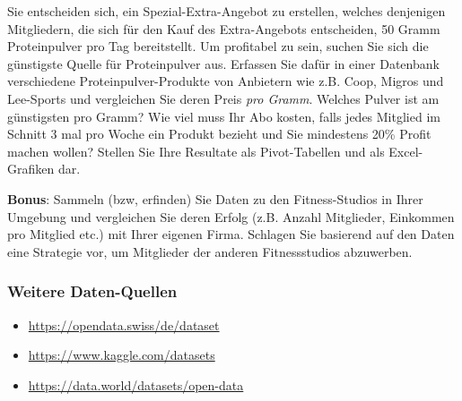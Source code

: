 Sie entscheiden sich, ein Spezial-Extra-Angebot zu erstellen, welches denjenigen Mitgliedern, die sich für den Kauf des Extra-Angebots entscheiden, 50 Gramm Proteinpulver pro Tag bereitstellt. Um profitabel zu sein, suchen Sie sich die günstigste Quelle für Proteinpulver aus. Erfassen Sie dafür in einer Datenbank verschiedene Proteinpulver-Produkte von Anbietern wie z.B. Coop, Migros und Lee-Sports und vergleichen Sie deren Preis \textit{pro Gramm}. Welches Pulver ist am günstigsten pro Gramm? Wie viel muss Ihr Abo kosten, falls jedes Mitglied im Schnitt 3 mal pro Woche ein Produkt bezieht und Sie mindestens 20\% Profit machen wollen? Stellen Sie Ihre Resultate als Pivot-Tabellen und als Excel-Grafiken dar.

\textbf{Bonus}: Sammeln (bzw, erfinden) Sie Daten zu den Fitness-Studios in Ihrer Umgebung und vergleichen Sie deren Erfolg (z.B. Anzahl Mitglieder, Einkommen pro Mitglied etc.) mit Ihrer eigenen Firma. Schlagen Sie basierend auf den Daten eine Strategie vor, um Mitglieder der anderen Fitnessstudios abzuwerben.


\subsubsection*{Weitere Daten-Quellen}
\begin{itemize}
	\item \url{https://opendata.swiss/de/dataset}
	\item \url{https://www.kaggle.com/datasets}
	\item \url{https://data.world/datasets/open-data}
\end{itemize}